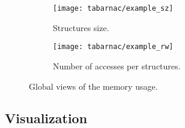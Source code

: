




\begin{figure}[htb]
    \centering
    \begin{subfigure}{.49\linewidth}
        \texttt{[image: tabarnac/example\_sz]}
        \caption{Structures size.}
        \label{fig:example_sz}
    \end{subfigure}
    \begin{subfigure}{.49\linewidth}
        \texttt{[image: tabarnac/example\_rw]}
        \caption{Number of accesses per structures.}
        \label{fig:example_rw}
    \end{subfigure}
    \caption{Global views of the memory usage.}
    \label{fig:example_plot1}
\end{figure}

\subsection{Visualization}

